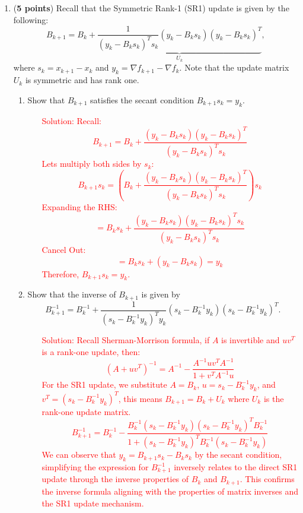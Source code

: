 \documentclass[11pt]{article}
\begin{document}
\begin{enumerate}
\begin{enumerate}
\end{enumerate}





  
  \item ({\bf 5 points}) Recall that the Symmetric Rank-1 (SR1) update
    is given by the following:
  $$B_{k+1} = B_k + \underbrace{\frac{1}{(y_k - B_ks_k)^Ts_k}(y_k
    -B_ks_k)(y_k- B_ks_k)^T}_{U_k},$$ where $s_k = x_{k+1}-x_{k}$ and
  $y_k = \nabla f_{k+1} - \nabla f_k$. Note that the update matrix
  $U_k$ is symmetric and has rank one.

  
  \begin{enumerate}
  \item Show that $B_{k+1}$ satisfies the secant condition $B_{k+1} s_k = y_k$.


\begin{enumerate}
    \item[\textcolor{red}{Solution:}] 
    \textcolor{red}{Recall:}
    \textcolor{red}{
    \[
    B_{k+1} = B_k + \frac{(y_k - B_ks_k)(y_k - B_ks_k)^T}{(y_k - B_ks_k)^Ts_k}
    \]
    }
    \textcolor{red}{Lets multiply both sides by \(s_k\):}
    \textcolor{red}{
    \[
    B_{k+1}s_k = (B_k + \frac{(y_k - B_ks_k)(y_k - B_ks_k)^T}{(y_k - B_ks_k)^Ts_k})s_k
    \]
    }
    \textcolor{red}{Expanding the RHS:}
    \textcolor{red}{
    \[
    = B_ks_k + \frac{(y_k - B_ks_k)(y_k - B_ks_k)^Ts_k}{(y_k - B_ks_k)^Ts_k}
    \]
    }
    \textcolor{red}{Cancel Out:}
    \textcolor{red}{
    \[
    = B_ks_k + (y_k - B_ks_k) = y_k
    \]
    }
    \textcolor{red}{Therefore, \(B_{k+1}s_k = y_k\).}
\end{enumerate}



  
  \item Show that the inverse of $B_{k+1}$ is given by
    $$ B_{k+1}^{-1} = B_k^{-1} + \frac{1}{(s_k - B_k^{-1}y_k)^Ty_k}(s_k -
    B_k^{-1}y_k)(s_k - B_k^{-1}y_k)^T.
    $$

\begin{enumerate}
    \item[\textcolor{red}{Solution:}] 
    \textcolor{red}{Recall Sherman-Morrison formula, if \(A\) is invertible and \(uv^T\) is a rank-one update, then:}
    \textcolor{red}{
    \[
    (A + uv^T)^{-1} = A^{-1} - \frac{A^{-1}uv^TA^{-1}}{1 + v^TA^{-1}u}
    \]
    }
    \textcolor{red}{For the SR1 update, we substitute \(A = B_k\), \(u = s_k - B_k^{-1}y_k\), and \(v^T = (s_k - B_k^{-1}y_k)^T\), this means \(B_{k+1} = B_k + U_k\) where \(U_k\) is the rank-one update matrix.}
    \textcolor{red}{
    \[
    B_{k+1}^{-1} = B_k^{-1} - \frac{B_k^{-1}(s_k - B_k^{-1}y_k)(s_k - B_k^{-1}y_k)^TB_k^{-1}}{1 + (s_k - B_k^{-1}y_k)^TB_k^{-1}(s_k - B_k^{-1}y_k)}
    \]
    }
    \textcolor{red}{We can observe that \(y_k = B_{k+1}s_k - B_ks_k\) by the secant condition, simplifying the expression for \(B_{k+1}^{-1}\) inversely relates to the direct SR1 update through the inverse properties of \(B_k\) and \(B_{k+1}\).}
    \textcolor{red}{This confirms the inverse formula aligning with the properties of matrix inverses and the SR1 update mechanism.}
\end{enumerate}



\end{enumerate}
\end{enumerate}
\end{document}
